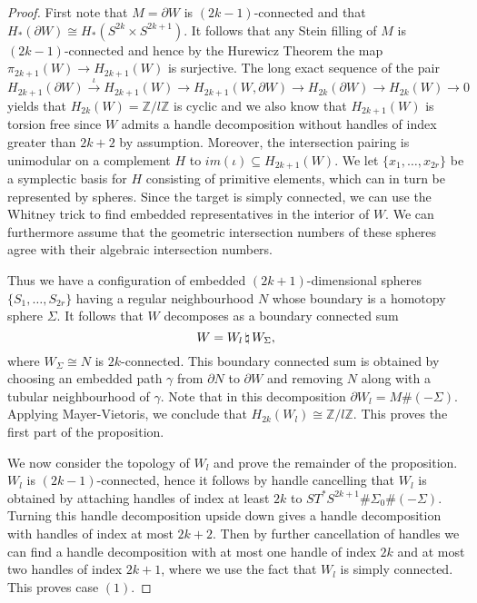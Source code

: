 \documentclass[12pt]{amsart}
\newcommand\Z{\mathbb{Z}}
\newcommand\del{\partial}
\theoremstyle{remark}
\begin{document}
\begin{proof}
First note that $M=\del W$ is $(2k{-}1)$-connected and that $H_*(\del W)
\cong H_*(S^{2k} \times S^{2k{+}1})$.  It follows that any Stein filling
of $M$ is $(2k{-}1)$-connected and hence by the Hurewicz Theorem the map
$\pi_{2k{+}1}(W) \longrightarrow H_{2k{+}1}(W)$ is surjective.  The long
exact sequence of the pair
%
$$ H_{2k{+}1}(\partial W)\stackrel{\iota} \longrightarrow H_{2k{+}1}(W)
\longrightarrow H_{2k{+}1}(W,\partial W)\longrightarrow
H_{2k}(\partial W) \longrightarrow H_{2k}(W) \longrightarrow 0$$
%
yields that $H_{2k}(W) = \Z / l\Z$ is cyclic and we also know that
$H_{2k{+}1}(W)$ is torsion free since $W$ admits a handle decomposition without handles of index greater than $2k+2$ by assumption. Moreover, the intersection pairing is unimodular on a
complement $H$ to $im(\iota) \subseteq H_{2k{+}1}(W)$.  We let
$\{x_1,\ldots, x_{2r}\}$ be a symplectic basis for $H$ consisting of
primitive elements, which can in turn be represented by spheres. Since
the target is simply connected, we can use the Whitney trick to find
embedded representatives in the interior of $W$. We can furthermore
assume that the geometric intersection numbers of these spheres agree
with their algebraic intersection numbers.

Thus we have a configuration of embedded $(2k{+}1)$-dimensional spheres $\{S_1,\ldots, S_{2r}\}$ 
having a regular neighbourhood $N$ whose boundary is a homotopy sphere $\Sigma$.
It follows that $W$ decomposes as a boundary connected sum
%
$$W =W_l\thinspace  \natural \thinspace W_\Sigma,$$
%
where $W_\Sigma \cong N$ is $2k$-connected. This boundary connected sum is obtained by choosing an embedded path $\gamma$ from $\partial N$ to $\partial W$ and removing $N$ along with a tubular neighbourhood of $\gamma$. Note that in this decomposition $\partial W_l = M \# (-\Sigma)$.  Applying Mayer-Vietoris, we conclude that $H_{2k}(W_l) \cong \Z / l\Z$.
This proves the first part of the proposition.

We now consider the topology of $W_l$ and prove the remainder of the
proposition.  $W_l$ is $(2k{-}1)$-connected, hence it follows
by handle cancelling that $W_l$ is obtained by attaching handles of
index at least $2k$ to $ST^*S^{2k{+}1} \# \Sigma_0 \# (-\Sigma)$. Turning this handle
decomposition upside down gives a handle decomposition with handles of
index at most $2k+2$.  Then by further cancellation of handles we can
find a handle decomposition with at most one handle of index $2k$ and
at most two handles of index $2k{+}1$, where we use the fact that $W_l$
is simply connected.  This proves case $(1)$.


\end{proof}
\end{document}

